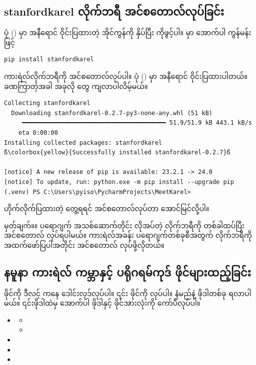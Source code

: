 \subsection*{stanfordkarel လိုက်ဘရီ အင်စတောလ်လုပ်ခြင်း}
ပုံ (\fRefNo{\ref{fig:install_karel}}) မှာ အနီရောင် ဝိုင်းပြထားတဲ့ အိုင်ကွန်ကို နှိပ်ပြီး  ကိုဖွင့်ပါ။  မှာ အောက်ပါ ကွန်မန်းဖြင့် 
%
\begin{verbatim}
pip install stanfordkarel
\end{verbatim}
%
ကားရဲလ်လိုက်ဘရီကို အင်စတောလ်လုပ်ပါ။ ပုံ (\fRefNo{\ref{fig:install_karel}}) မှာ  အနီရောင် ဝိုင်းပြထားပါတယ်။ ခဏကြာတဲ့အခါ အခုလို တွေ ကျလာပါလိမ့်မယ်။ 

%
\begin{verbatim}
Collecting stanfordkarel
  Downloading stanfordkarel-0.2.7-py3-none-any.whl (51 kB)
     ━━━━━━━━━━━━━━━━━━━━━━━━━━━━━━━━━━━━━━━━ 51.9/51.9 kB 443.1 kB/s 
    eta 0:00:00
Installing collected packages: stanfordkarel
ß\colorbox{yellow}{Successfully installed stanfordkarel-0.2.7}ß

[notice] A new release of pip is available: 23.2.1 -> 24.0
[notice] To update, run: python.exe -m pip install --upgrade pip
(.venv) PS C:\Users\pyiso\PycharmProjects\MeetKarel>
\end{verbatim}
%
ဟိုက်လိုက်ပြထားတဲ့  တွေ့ရရင် အင်စတောလ်လုပ်တာ အောင်မြင်လို့ပါ။

\begin{mytcbox}
မှတ်ချက်။\qquad ။ ပရောဂျက် အသစ်ဆောက်တိုင်း လိုအပ်တဲ့ လိုက်ဘရီကို တစ်ခါထပ်ပြီး အင်စတောလ် လုပ်ရပါမယ်။ ကားရဲလ်အခန်း ပရောဂျက်တစ်ခုစီအတွက်  လိုက်ဘရီကို အထက်ဖော်ပြပါအတိုင်း အင်စတောလ် လုပ်ဖို့လိုတယ်။
\end{mytcbox}

\clearpage
\subsection*{နမူနာ ကားရဲလ် ကမ္ဘာနှင့် ပရိုဂရမ်ကုဒ် ဖိုင်များထည့်ခြင်း}
 ဖိုင်ကို  ဒီလင့်  ကနေ ဒေါင်းလုဒ်လုပ်ပါ။ ၎င်း  ဖိုင်ကို  လုပ်ပါ။  နံမည်နဲ့ ဖိုဒါတစ်ခု ရလာပါမယ်။ ၎င်းဖိုဒါထဲမှ အောက်ပါ  ဖိုဒါနှင့်  ဖိုင်အားလုံးကို ကော်ပီလုပ်ပါ။ 
%
\begin{itemize}
    \item {} 
    \begin{itemize}
        \item {}
        \item {}
    \end{itemize}
    \item {}
    \item {}
    \item {}
\end{itemize}
%

